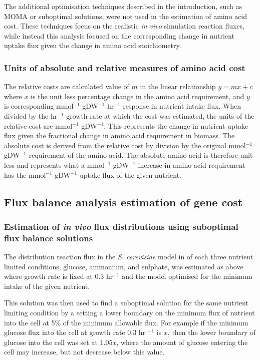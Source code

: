The additional optimisation techniques described in the introduction, such as MOMA or suboptimal solutions, were not used in the estimation of amino acid cost. These techniques focus on the realistic \emph{in vivo} simulation reaction fluxes, while instead this analysis focused on the corresponding change in nutrient uptake flux given the change in amino acid stoichiometry.

\subsubsection{Units of absolute and relative measures of amino acid cost}

The relative costs are calculated value of $m$ in the linear relationship $y = mx + c$ where $x$ is the unit less percentage change in the amino acid requirement, and $y$ is corresponding mmol$^{-1}$ gDW$^{-1}$ hr$^{-1}$ response in nutrient intake flux. When divided by the hr$^{-1}$ growth rate at which the cost was estimated, the units of the relative cost are mmol$^{-1}$ gDW$^{-1}$. This represents the change in nutrient uptake flux given the fractional change in amino acid requirement in biomass. The absolute cost is derived from the relative cost by division by the original mmol$^{-1}$ gDW$^{-1}$ requirement of the amino acid. The absolute amino acid is therefore unit less and represents what a mmol$^{-1}$ gDW$^{-1}$ increase in amino acid requirement has the mmol$^{-1}$ gDW$^{-1}$ uptake flux of the given nutrient.

\subsection{Flux balance analysis estimation of gene cost}

\subsubsection{Estimation of \emph{in vivo} flux distributions using suboptimal flux balance solutions}

The distribution reaction flux in the \emph{S. cerevisiae} model in of each three nutrient limited conditions, glucose, ammonium, and sulphate, was estimated as above where growth rate is fixed at 0.3 hr$^{-1}$ and the model optimised for the minimum intake of the given nutrient.

This solution was then used to find a suboptimal solution for the same nutrient limiting condition by a setting a lower boundary on the minimum flux of nutrient into the cell at 5\% of the minimum allowable flux. For example if the minimum glucose flux into the cell at growth rate 0.3 hr $^{-1}$ is $x$, then the lower boundary of glucose into the cell was set at 1.05$x$, where the amount of glucose entering the cell may increase, but not decrease below this value.

